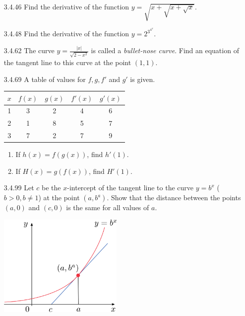 \documentclass{article}
\begin{document}
\begin{enumerate}
    \vspace{2cm}

    \item[3.4.46]
        Find the derivative of the function $\displaystyle y= \sqrt{x + \sqrt{x + \sqrt{x}}}$.

    \vspace{6cm}

    \item[3.4.48]
        Find the derivative of the function $\displaystyle y = 2^{3^{4^{x}}}$.

    \newpage

    \item[3.4.62]
        The curve $\displaystyle y = \frac{|x|}{\sqrt{2 - x^{2}}}$ is called a
        \textit{bullet-nose curve}. Find an equation of the tangent line
        to this curve at the point $(1, 1)$.

    \vspace{8cm}

    \item[3.4.69]
        A table of values for $f, g, f'$ and $g'$ is given.
        \begin{center}
            \begin{tabular}{ |c|c|c|c|c| }
                \hline
                $x$ & $f(x)$ & $g(x)$ & $f'(x)$ & $g'(x)$ \\
                \hline
                1 & 3 & 2 & 4 & 6 \\
                \hline
                2 & 1 & 8 & 5 & 7 \\
                \hline
                3 & 7 & 2 & 7 & 9 \\
                \hline
            \end{tabular}
        \end{center}

        \begin{enumerate}
            \item
                If $h(x) = f(g(x))$, find $h'(1)$.
            \item
                If $H(x) = g(f(x))$, find $H'(1)$.
        \end{enumerate}

    \newpage

    \item[3.4.99]
        Let $c$ be the $x$-intercept of the tangent line to the curve $y=b^{x}$
        ($b > 0, b \neq 1$) at the point $(a, b^{a})$. Show that the
        distance between the points $(a, 0)$ and $(c, 0)$ is the
        same for all values of $a$.

        \begin{center}
            \includegraphics[width=6cm]{./png/3.4.99.png}
        \end{center}

\end{enumerate}
\end{document}
